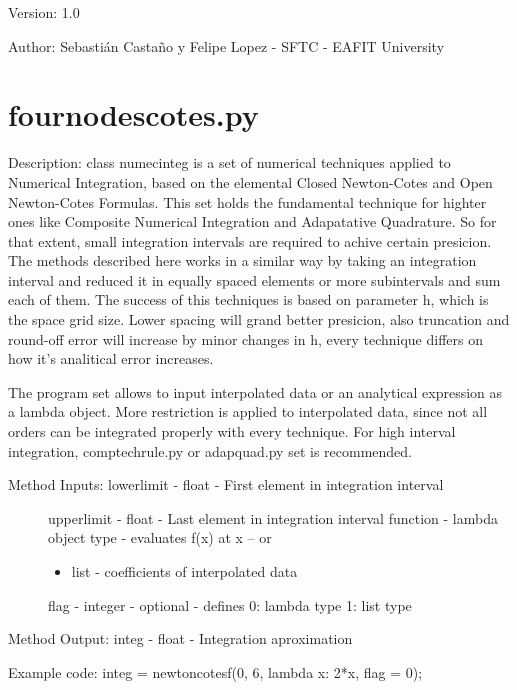 \documentclass[letterpaper,10pt,oneside]{sphinxmanual}
\theoremstyle{plain}%
\theoremstyle{definition}%
\theoremstyle{remark}%
\begin{document}
Version: 1.0

Author: Sebastián Castaño y Felipe Lopez - SFTC - EAFIT University


\section{fournodescotes.py}
\label{code:fournodescotes-py}\label{code:module-fournodescotes}
Description: class numecinteg is a set of numerical techniques applied to
Numerical Integration, based on the elemental Closed Newton-Cotes and
Open Newton-Cotes Formulas. This set holds the fundamental technique for
highter ones like Composite Numerical Integration and Adapatative Quadrature.
So for that extent, small integration intervals are required to achive certain
presicion. The methods described here works in a similar way by taking an
integration interval and reduced it in equally spaced elements or more 
subintervals and sum each of them. The success of this techniques is based
on parameter h, which is the space grid size. Lower spacing will grand better
presicion, also truncation and round-off error will increase by minor changes
in h, every technique differs on how it's analitical error increases.

The program set allows to input interpolated data or an analytical expression
as a lambda object. More restriction is applied to interpolated data, since
not all orders can be integrated properly with every technique. For high 
interval integration, comptechrule.py or adapquad.py set is recommended.
\begin{description}
\item[{Method Inputs: lowerlimit - float - First element in integration interval}] \leavevmode
upperlimit - float - Last element in integration interval
function - lambda object type - evaluates f(x) at x -- or
\begin{itemize}
\item {} 
list - coefficients of interpolated data

\end{itemize}

flag - integer - optional - defines 0: lambda type 1: list type

\end{description}

Method Output: integ - float - Integration aproximation

Example code: integ = newtoncotesf(0, 6, lambda x: 2*x, flag = 0);
\end{document}
